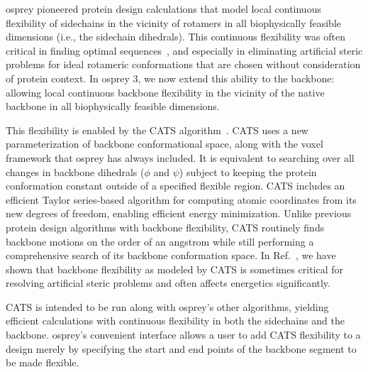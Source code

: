 {\sc osprey} pioneered protein design calculations that model local continuous flexibility of sidechains in the vicinity of rotamers in all biophysically feasible dimensions (i.e., the sidechain dihedrals).  This continuous flexibility was often critical in finding optimal sequences~\cite{iMinDEE}, and especially in eliminating artificial steric problems for ideal rotameric conformations that are chosen without consideration of protein context.  In {\sc osprey} 3, we now extend this ability to the backbone: allowing local continuous backbone flexibility in the vicinity of the native backbone in all biophysically feasible dimensions.  

This flexibility is enabled by the CATS algorithm~\cite{CATS}.  CATS uses a new parameterization of backbone conformational space, along with the voxel framework that {\sc osprey} has always included.  It is equivalent to searching over all changes in backbone dihedrals ($\phi$ and $\psi$) subject to keeping the protein conformation constant outside of a specified flexible region. CATS includes an efficient Taylor series-based algorithm for computing atomic coordinates from its new degrees of freedom, enabling efficient energy minimization.  Unlike previous protein design algorithms with backbone flexibility, CATS routinely finds backbone motions on the order of an angstrom while still performing a comprehensive search of its backbone conformation space.  In Ref.~, we have shown that backbone flexibility as modeled by CATS is sometimes critical for resolving artificial steric problems and often affects energetics significantly.  

CATS is intended to be run along with {\sc osprey}'s other algorithms, yielding efficient calculations with continuous flexibility in both the sidechains and the backbone. {\sc osprey}'s convenient interface allows a user to add CATS flexibility to a design merely by specifying the start and end points of the backbone segment to be made flexible.  